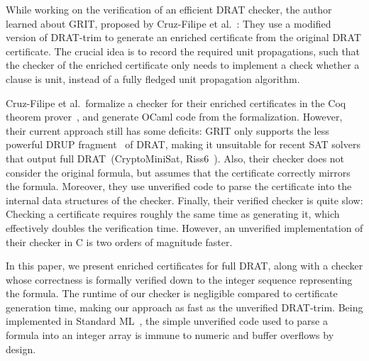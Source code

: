 \documentclass{llncs}
\begin{document}
While working on the verification of an efficient DRAT checker, the author learned about GRIT, proposed by Cruz-Filipe et al.~\cite{CMS16}: 
They use a modified version of DRAT-trim to generate an enriched certificate from the original DRAT certificate. 
The crucial idea is to record the required unit propagations, such that the checker of the enriched certificate only needs 
to implement a check whether a clause is unit, instead of a fully fledged unit propagation algorithm.

Cruz-Filipe et al.\ formalize a checker for their enriched certificates in the Coq theorem prover~\cite{BeCa10}, and generate OCaml code from the formalization. 
However, their current approach still has some deficits:
GRIT only supports the less powerful DRUP fragment~\cite{WHH13} of DRAT, making it unsuitable for recent SAT solvers that output full DRAT~(\eg CryptoMiniSat, Riss6~\cite{SATCOMP16}).
Also, their checker does not consider the original formula, but assumes that the certificate correctly mirrors the formula. 
Moreover, they use unverified code to parse the certificate into the internal data structures of the checker.
Finally, their verified checker is quite slow: Checking a certificate requires roughly the same time as generating it, which effectively doubles the verification time.
However, an unverified implementation of their checker in C is two orders of magnitude faster.


% 
% 

In this paper, we present enriched certificates for full DRAT, along with a checker whose correctness is formally verified down to the integer sequence 
representing the formula. The runtime of our checker is negligible compared to certificate generation time, making our approach as fast as the unverified DRAT-trim.
Being implemented in Standard ML~\cite{MHMT97}, the simple unverified code used to parse a formula into an integer array is immune to numeric and buffer overflows by design.
\end{document}
